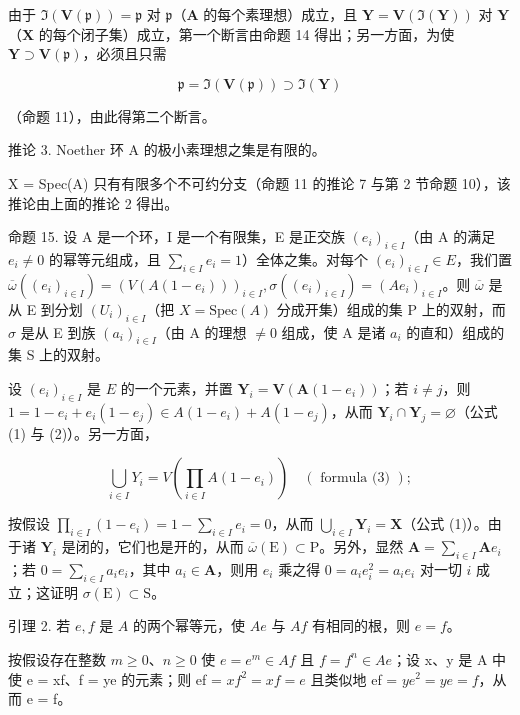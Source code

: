 由于 \(\Im (\mathbf{V}(\mathfrak{p})) = \mathfrak{p}\) 对 \(\mathfrak{p}\)（\(\mathbf{A}\) 的每个素理想）成立，且 \(\mathbf{Y} = \mathbf{V}(\Im (\mathbf{Y}))\) 对 \(\mathbf{Y}\)（\(\mathbf{X}\) 的每个闭子集）成立，第一个断言由命题 14 得出；另一方面，为使 \(\mathbf{Y} \supset \mathbf{V}(\mathfrak{p})\)，必须且只需

\[
\mathfrak {p} = \Im (\mathbf {V} (\mathfrak {p})) \supset \Im (\mathbf {Y})
\]

（命题 11），由此得第二个断言。

推论 3. Noether 环 A 的极小素理想之集是有限的。

X = Spec(A) 只有有限多个不可约分支（命题 11 的推论 7 与第 2 节命题 10），该推论由上面的推论 2 得出。

命题 15. 设 A 是一个环，I 是一个有限集，E 是正交族 \((e_i)_{i \in I}\)（由 A 的满足 \(e_i \neq 0\) 的幂等元组成，且 \(\sum_{i \in I} e_i = 1\)）全体之集。对每个 \((e_i)_{i \in I} \in E\)，我们置 \(\overline{\omega}((e_i)_{i \in I}) = (V(A(1 - e_i)))_{i \in I}, \sigma((e_i)_{i \in I}) = (Ae_i)_{i \in I}\)。则 \(\overline{\omega}\) 是从 E 到分划 \((U_i)_{i \in I}\)（把 \(X = \text{Spec}(A)\) 分成开集）组成的集 P 上的双射，而 \(\sigma\) 是从 E 到族 \((a_i)_{i \in I}\)（由 A 的理想 \(\neq 0\) 组成，使 A 是诸 \(a_i\) 的直和）组成的集 S 上的双射。

设 \((e_i)_{i\in I}\) 是 \(E\) 的一个元素，并置 \(\mathbf{Y}_i = \mathbf{V}(\mathbf{A}(1 - e_i))\)；若 \(i\neq j\)，则 \(1 = 1 - e_i + e_i(1 - e_j)\in A(1 - e_i) + A(1 - e_j)\)，从而 \(\mathbf{Y}_i\cap \mathbf{Y}_j = \varnothing\)（公式 (1) 与 (2)）。另一方面，

\[
\bigcup_ {i \in I} Y _ {i} = V \left(\prod_ {i \in I} A (1 - e _ {i})\right) \quad (\text { formula   (3) });
\]

按假设 \(\prod_{i\in I}(1 - e_i) = 1 - \sum_{i\in I}e_i = 0\)，从而 \(\bigcup_{i\in I}\mathbf{Y}_i = \mathbf{X}\)（公式 (1)）。由于诸 \(\mathbf{Y}_i\) 是闭的，它们也是开的，从而 \(\overline{\omega} (\mathrm{E})\subset \mathrm{P}\)。另外，显然 \(\mathbf{A} = \sum_{i\in I}\mathbf{A}e_i\)；若 \(0 = \sum_{i\in I}a_{i}e_{i}\)，其中 \(a_{i}\in \mathbf{A}\)，则用 \(e_i\) 乘之得 \(0 = a_i e_i^2 = a_i e_i\) 对一切 \(i\) 成立；这证明 \(\sigma (\mathrm{E})\subset \mathrm{S}\)。

引理 2. 若 \(e, f\) 是 \(A\) 的两个幂等元，使 \(Ae\) 与 \(Af\) 有相同的根，则 \(e = f\)。

按假设存在整数 \(m \geqslant 0\)、\(n \geqslant 0\) 使 \(e = e^{m} \in Af\) 且 \(f = f^{n} \in Ae\)；设 x、y 是 A 中使 e = xf、f = ye 的元素；则 ef = \(xf^{2} = xf = e\) 且类似地 ef = \(ye^{2} = ye = f\)，从而 e = f。

